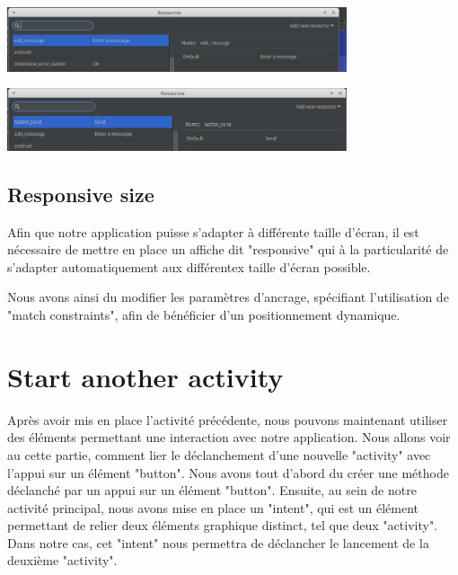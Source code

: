 \documentclass[french,a4paper,12pt]{report}
\begin{document}
\includegraphics[width=10cm]{19.png}

\includegraphics[width=10cm]{20.png}

\subsection{Responsive size}
Afin que notre application puisse s'adapter à différente taille d'écran, il est
nécessaire de mettre en place un affiche dit "responsive" qui à la particularité
de s'adapter automatiquement aux différentex taille d'écran possible.

Nous avons ainsi du modifier les paramètres d'ancrage, spécifiant l'utilisation
de "match constraints", afin de bénéficier d'un positionnement dynamique.

\section{Start another activity}
Après avoir mis en place l'activité précédente, nous pouvons maintenant utiliser
des éléments permettant une interaction avec notre application. Nous allons voir
au cette partie, comment lier le déclanchement d'une nouvelle "activity" avec
l'appui sur un élément "button".
\bigbreak
Nous avons tout d'abord du créer une méthode déclanché par un appui sur un
élément "button".
\bigbreak
 Ensuite, au sein de notre activité principal, nous avons mise en place un "intent",
 qui est un élément permettant de relier deux éléments graphique distinct, tel
 que deux "activity". Dans notre cas, cet "intent" nous permettra de déclancher
 le lancement de la deuxième "activity".
 \bigbreak
\end{document}

